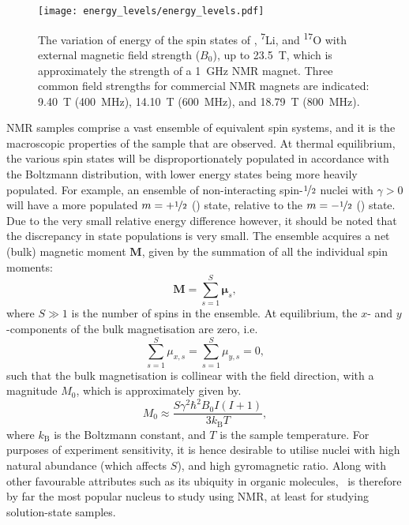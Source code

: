\begin{figure}
    \centering
    \texttt{[image: energy\_levels/energy\_levels.pdf]}
    \caption[
        The variation of energy of the spin states of \proton,
        \textsuperscript{7}Li, and \textsuperscript{17}O with external magnetic
        field strength.
    ]{
        The variation of energy of the spin states of \proton,
        \textsuperscript{7}Li, and \textsuperscript{17}O with external magnetic
        field strength ($B_0$), up to \qty{23.5}{\tesla}, which is
        approximately the strength of a \qty{1}{\giga \hertz} \ac{NMR} magnet.
        Three common field strengths for commercial NMR magnets are indicated:
        \qty{9.40}{\tesla} (\qty{400}{\mega\hertz}), \qty{14.10}{\tesla}
        (\qty{600}{\mega\hertz}), and \qty{18.79}{\tesla}
        (\qty{800}{\mega\hertz}).
    }
    \label{fig:energy_levels}
\end{figure}

\ac{NMR} samples comprise a vast ensemble of equivalent spin systems, and it is
the macroscopic properties of the sample that are observed.
At thermal equilibrium, the various spin states will be disproportionately
populated in accordance with the Boltzmann distribution, with lower energy
states being more heavily populated. For example, an ensemble of
non-interacting spin-$\nicefrac{1}{2}$ nuclei with $\gamma > 0$ will have a
more populated $m = +\nicefrac{1}{2}$ (\textalpha) state, relative
to the $m = -\nicefrac{1}{2}$ (\textbeta) state. Due to the very small relative
energy difference however, it should be noted that the discrepancy in state
populations is very small.
The ensemble acquires a net (bulk) magnetic moment $\symbf{M}$, given by the
summation of all the individual spin moments:
\begin{equation}
    \symbf{M} = \sum\limits_{s=1}^{S} \symbf{\mu}_s,
\end{equation}
where $S \gg 1$ is the number of spins in the ensemble.
At equilibrium, the $x$- and $y$-components of the bulk magnetisation are zero,
i.e.
\begin{equation}
    \sum_{s=1}^{S} \mu_{x,s} = \sum_{s=1}^{S} \mu_{y,s} = 0,
\end{equation}
such that the bulk magnetisation is collinear with the field direction, with a
magnitude $M_0$, which is approximately given by\cite[\S 1.1]{Cavanagh2007}.
\begin{equation}
    M_0 \approx \frac{S \gamma^2 \hbar^2 B_0 I (I + 1)}{3 k_{\text{B}} T},
\end{equation}
where $k_{\text{B}}$ is the Boltzmann constant, and $T$ is the sample
temperature. For purposes of experiment sensitivity, it is hence desirable to
utilise nuclei with high natural abundance (which affects $S$), and high
gyromagnetic ratio. Along with other favourable attributes such as its ubiquity
in organic molecules, \proton\ is therefore by far the most popular nucleus to
study using \ac{NMR}, at least for studying solution-state samples.

